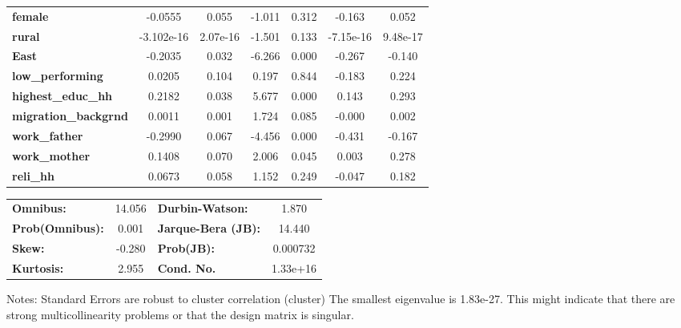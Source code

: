 \begin{center}
\begin{tabular}{lcccccc}
\textbf{female}                          &      -0.0555  &        0.055     &    -1.011  &         0.312        &       -0.163    &        0.052     \\
\textbf{rural}                           &   -3.102e-16  &     2.07e-16     &    -1.501  &         0.133        &    -7.15e-16    &     9.48e-17     \\
\textbf{East}                            &      -0.2035  &        0.032     &    -6.266  &         0.000        &       -0.267    &       -0.140     \\
\textbf{low\_performing}                 &       0.0205  &        0.104     &     0.197  &         0.844        &       -0.183    &        0.224     \\
\textbf{highest\_educ\_hh}               &       0.2182  &        0.038     &     5.677  &         0.000        &        0.143    &        0.293     \\
\textbf{migration\_backgrnd}             &       0.0011  &        0.001     &     1.724  &         0.085        &       -0.000    &        0.002     \\
\textbf{work\_father}                    &      -0.2990  &        0.067     &    -4.456  &         0.000        &       -0.431    &       -0.167     \\
\textbf{work\_mother}                    &       0.1408  &        0.070     &     2.006  &         0.045        &        0.003    &        0.278     \\
\textbf{reli\_hh}                        &       0.0673  &        0.058     &     1.152  &         0.249        &       -0.047    &        0.182     \\
\bottomrule
\end{tabular}
\begin{tabular}{lclc}
\textbf{Omnibus:}       & 14.056 & \textbf{  Durbin-Watson:     } &    1.870  \\
\textbf{Prob(Omnibus):} &  0.001 & \textbf{  Jarque-Bera (JB):  } &   14.440  \\
\textbf{Skew:}          & -0.280 & \textbf{  Prob(JB):          } & 0.000732  \\
\textbf{Kurtosis:}      &  2.955 & \textbf{  Cond. No.          } & 1.33e+16  \\
\bottomrule
\end{tabular}
\end{center}

Notes: \newline
 [1] Standard Errors are robust to cluster correlation (cluster) \newline
 [2] The smallest eigenvalue is 1.83e-27. This might indicate that there are \newline
 strong multicollinearity problems or that the design matrix is singular.

